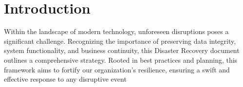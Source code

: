 \section{Introduction}

Within the landscape of modern technology, unforeseen disruptions poses a significant challenge. Recognizing the importance of preserving data integrity, system functionality, and business continuity, this Disaster Recovery document outlines a comprehensive strategy. Rooted in best practices and planning, this framework aims to fortify our organization's resilience, ensuring a swift and effective response to any disruptive event